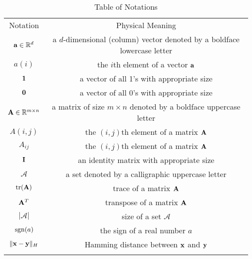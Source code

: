 \begin{table}[ht]
\caption{Table of Notations}
\vspace{0.5cm}
\centering
\begin{tabular}{c|c}
\toprule[1pt]\addlinespace[0pt]
Notation & Physical Meaning\\
\addlinespace[0pt]\midrule[1pt]\addlinespace[0pt]
${\bf a}\in\mathbb{R}^{d}$ & a $ d $-dimensional (column) vector denoted by a boldface lowercase letter\\
\addlinespace[0pt]\midrule[0.5pt]\addlinespace[0pt]
$a(i)$ & the $i$th element of a vector ${\bf a}$\\
\addlinespace[0pt]\midrule[0.5pt]\addlinespace[0pt]
${\bf 1}$ & a vector of all 1's with appropriate size\\
\addlinespace[0pt]\midrule[0.5pt]\addlinespace[0pt]
${\bf 0}$ & a vector of all 0's with appropriate size\\
\addlinespace[0pt]\midrule[0.5pt]\addlinespace[0pt]
${\bf A}\in\mathbb{R}^{m\times n}$ & a matrix of size $ m \times n $ denoted by a boldface uppercase letter\\
\addlinespace[0pt]\midrule[0.5pt]\addlinespace[0pt]
$A(i,j)$ & the $(i,j)$th element of a matrix ${\bf A}$\\
\addlinespace[0pt]\midrule[0.5pt]\addlinespace[0pt]
$A_{ij}$ & the $(i,j)$th element of a matrix ${\bf A}$\\
\addlinespace[0pt]\midrule[0.5pt]\addlinespace[0pt]
${\bf I}$ & an identity matrix with appropriate size\\
\addlinespace[0pt]\midrule[0.5pt]\addlinespace[0pt]
$\mathcal{A}$ & a set denoted by a calligraphic uppercase letter\\
\addlinespace[0pt]\midrule[0.5pt]\addlinespace[0pt]
$\mathrm{tr}({\bf A})$ & trace of a matrix ${\bf A}$\\
\addlinespace[0pt]\midrule[0.5pt]\addlinespace[0pt]
${\bf A}^{T}$ & transpose of a matrix ${\bf A}$\\
\addlinespace[0pt]\midrule[0.5pt]\addlinespace[0pt]
$|\mathcal{A}|$ & size of a set $\mathcal{A}$\\
\addlinespace[0pt]\midrule[0.5pt]\addlinespace[0pt]
$\mathop{\rm sgn}(a)$ & the sign of a real number $a$\\
\addlinespace[0pt]\midrule[0.5pt]\addlinespace[0pt]
$\|{\bf x} - {\bf y}\|_{H}$ & Hamming distance between ${\bf x}$ and $ {\bf y} $\\
 \addlinespace[0pt]\bottomrule[1pt]
\end{tabular}
\label{table:notation}
\end{table}

